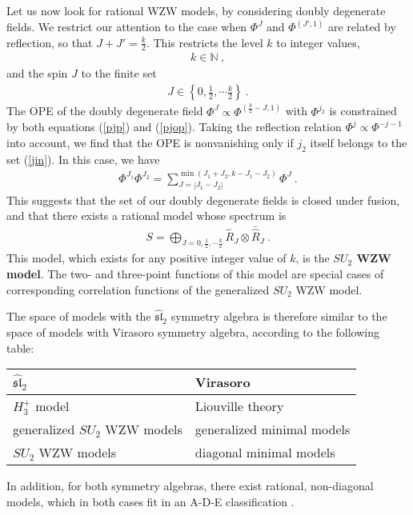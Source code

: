 \documentclass[12pt,a4paper,notitlepage]{report}
\newcommand \N {\mathbb{N}}
\numberwithin{equation}{section}
\theoremstyle{break}
\begin{document}
Let us now look for rational WZW models, by considering doubly degenerate fields. We restrict our attention to the case when $\Phi^{J}$ and $\Phi^{(J',1)}$ are related by reflection, so that $J+J'=\frac{k}{2}$. This restricts the level $k$ to integer values,  
\begin{align}
 \boxed{k\in \N}\ ,
\end{align}
and the spin $J$ to the finite set 
\begin{align}
 J\in \left\{0,\frac12,\cdots \frac{k}{2}\right\}\ .
\label{jin}
\end{align}
The OPE of the doubly degenerate field $\Phi^J \propto \Phi^{(\frac{k}{2}-J,1)}$ with $\Phi^{j_2}$ is constrained by both equations (\ref{pjp}) and (\ref{pjop}). Taking the reflection relation $\Phi^j\propto \Phi^{-j-1}$ into account, we find that the OPE is nonvanishing only if $j_2$ itself belongs to the set (\ref{jin}). In this case, we have 
\begin{align}
\boxed{\Phi^{J_1}\Phi^{J_2} = \sum_{J=|J_1-J_2|}^{\operatorname{min}(J_1+J_2,k-J_1-J_2)} \Phi^J}\ .
\end{align}
This suggests that the set of our doubly degenerate fields is closed under fusion, and that there exists a rational model whose spectrum is
\begin{align}
 \boxed{S = \bigoplus_{J=0,\frac12,\cdots \frac{k}{2}} \hat{R}_J \otimes \bar{\hat{R}}_J}\ .
\end{align}
This model, which exists for any positive integer value of $k$, is the \textbf{\boldmath $SU_2$ WZW model}.
The two- and three-point functions of this model are special cases of corresponding correlation functions of the generalized $SU_2$ WZW model. 

The space of models with the $\widehat{\mathfrak{sl}}_2$ symmetry algebra is therefore similar to the space of models with Virasoro symmetry algebra, according to the following table:
\begin{center}
\renewcommand{\arraystretch}{1.3}
 \begin{tabular}{|l|l|}
  \hline
 $\widehat{\mathfrak{sl}}_2$  & Virasoro 
\\
\hline
$H_3^+$ model & Liouville theory 
\\
generalized $SU_2$ WZW models & generalized minimal models
\\
$SU_2$ WZW models & diagonal minimal models
\\
\hline
 \end{tabular}
\end{center}
In addition, for both symmetry algebras, there exist rational, non-diagonal models, which in both cases fit in an A-D-E classification \cite{fms97}. 
\end{document}
